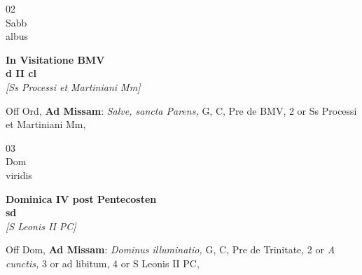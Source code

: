 \documentclass[10pt, openany]{book}
\begin{document}
        \begin{center}
            \begin{minipage}{3.5in}
                \vspace{2em}
                \begin{minipage}{0.5in}
                    {\Huge 02} \\
                    {\normalsize Sabb} \\
                    {\normalsize albus}
                \end{minipage}
                \begin{minipage}{3.0in}
                    \textbf{ \large In Visitatione BMV \\
                    \textnormal{\normalsize d II cl}} \\ \textit{[Ss Processi et Martiniani Mm]} \\ 
                \end{minipage}
                \begin{justify}Off Ord, \textbf{Ad Missam}: \textit{Salve, sancta Parens,} G, C, Pre de BMV, 2 or Ss Processi et Martiniani Mm,   
                \end{justify}
            \end{minipage}
        \end{center}
    
        \begin{center}
            \begin{minipage}{3.5in}
                \vspace{2em}
                \begin{minipage}{0.5in}
                    {\Huge 03} \\
                    {\normalsize Dom} \\
                    {\normalsize viridis}
                \end{minipage}
                \begin{minipage}{3.0in}
                    \textbf{ \large Dominica IV post Pentecosten \\
                    \textnormal{\normalsize sd}} \\ \textit{[S Leonis II PC]} \\ 
                \end{minipage}
                \begin{justify}Off Dom, \textbf{Ad Missam}: \textit{Dominus illuminatio,} G, C, Pre de Trinitate, 2 or \textit{A cunctis,} 3 or ad libitum, 4 or S Leonis II PC,   
                \end{justify}
            \end{minipage}
        \end{center}
    
\end{document}
